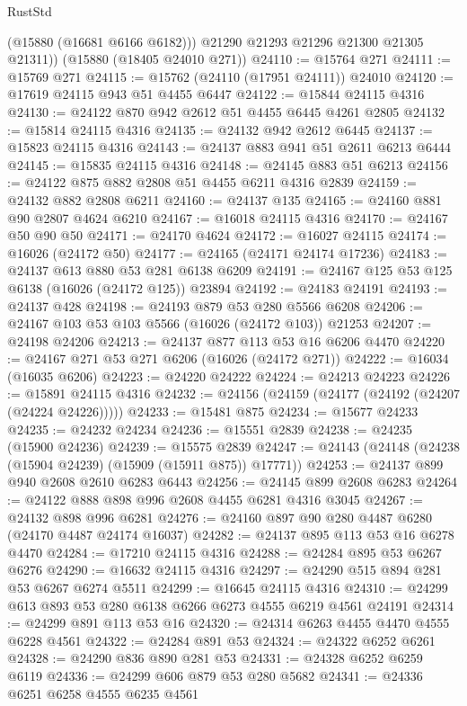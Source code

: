\begin{lexlean}{RustStd}
\begin{coremodule}
          (@15880 (@16681 @6166 @6182)))
        @21290
        @21293
        @21296
        @21300
        @21305
        @21311))
    (@15880 (@18405 @24010 @271))
@24110 := @15764 @271
@24111 := @15769 @271
@24115 := @15762 (@24110 (@17951 @24111)) @24010
@24120 := @17619 @24115 @943 @51 @4455 @6447
@24122 := @15844 @24115 @4316
@24130 := @24122 @870 @942 @2612 @51 @4455 @6445 @4261 @2805
@24132 := @15814 @24115 @4316
@24135 := @24132 @942 @2612 @6445
@24137 := @15823 @24115 @4316
@24143 := @24137 @883 @941 @51 @2611 @6213 @6444
@24145 := @15835 @24115 @4316
@24148 := @24145 @883 @51 @6213
@24156 := @24122 @875 @882 @2808 @51 @4455 @6211 @4316 @2839
@24159 := @24132 @882 @2808 @6211
@24160 := @24137 @135
@24165 := @24160 @881 @90 @2807 @4624 @6210
@24167 := @16018 @24115 @4316
@24170 := @24167 @50 @90 @50
@24171 := @24170 @4624
@24172 := @16027 @24115
@24174 := @16026 (@24172 @50)
@24177 := @24165 (@24171 @24174 @17236)
@24183 := @24137 @613 @880 @53 @281 @6138 @6209
@24191 := @24167 @125 @53 @125 @6138 (@16026 (@24172 @125)) @23894
@24192 := @24183 @24191
@24193 := @24137 @428
@24198 := @24193 @879 @53 @280 @5566 @6208
@24206 := @24167 @103 @53 @103 @5566 (@16026 (@24172 @103)) @21253
@24207 := @24198 @24206
@24213 := @24137 @877 @113 @53 @16 @6206 @4470
@24220 := @24167 @271 @53 @271 @6206 (@16026 (@24172 @271))
@24222 := @16034 (@16035 @6206)
@24223 := @24220 @24222
@24224 := @24213 @24223
@24226 := @15891 @24115 @4316
@24232 := @24156 (@24159 (@24177 (@24192 (@24207 (@24224 @24226)))))
@24233 := @15481 @875
@24234 := @15677 @24233
@24235 := @24232 @24234
@24236 := @15551 @2839
@24238 := @24235 (@15900 @24236)
@24239 := @15575 @2839
@24247 := @24143 (@24148 (@24238 (@15904 @24239) (@15909 (@15911 @875)) @17771))
@24253 := @24137 @899 @940 @2608 @2610 @6283 @6443
@24256 := @24145 @899 @2608 @6283
@24264 := @24122 @888 @898 @996 @2608 @4455 @6281 @4316 @3045
@24267 := @24132 @898 @996 @6281
@24276 := @24160 @897 @90 @280 @4487 @6280 (@24170 @4487 @24174 @16037)
@24282 := @24137 @895 @113 @53 @16 @6278 @4470
@24284 := @17210 @24115 @4316
@24288 := @24284 @895 @53 @6267 @6276
@24290 := @16632 @24115 @4316
@24297 := @24290 @515 @894 @281 @53 @6267 @6274 @5511
@24299 := @16645 @24115 @4316
@24310 := @24299 @613 @893 @53 @280 @6138 @6266 @6273 @4555 @6219 @4561 @24191
@24314 := @24299 @891 @113 @53 @16
@24320 := @24314 @6263 @4455 @4470 @4555 @6228 @4561
@24322 := @24284 @891 @53
@24324 := @24322 @6252 @6261
@24328 := @24290 @836 @890 @281 @53
@24331 := @24328 @6252 @6259 @6119
@24336 := @24299 @606 @879 @53 @280 @5682
@24341 := @24336 @6251 @6258 @4555 @6235 @4561

\end{coremodule}
\end{lexlean}
